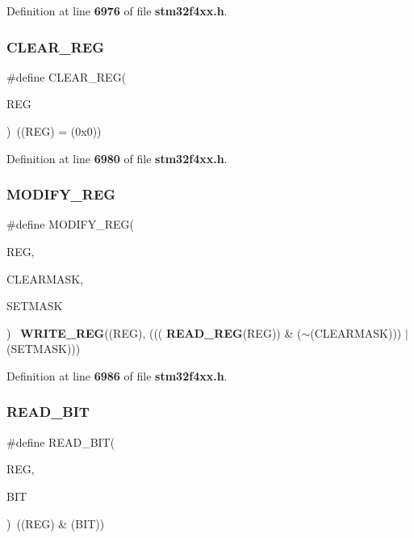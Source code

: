 Definition at line \textbf{ 6976} of file \textbf{ stm32f4xx.\+h}.

\mbox{\label{group__Exported__macro_ga1378fbdda39f40b85420df55f41460ef}} 
\subsubsection{C\+L\+E\+A\+R\+\_\+\+R\+EG}
{\footnotesize\ttfamily \#define C\+L\+E\+A\+R\+\_\+\+R\+EG(\begin{DoxyParamCaption}\item[{}]{R\+EG }\end{DoxyParamCaption})~((R\+EG) = (0x0))}



Definition at line \textbf{ 6980} of file \textbf{ stm32f4xx.\+h}.

\mbox{\label{group__Exported__macro_ga6553c99f510c3bab8cc0a91602053247}} 
\subsubsection{M\+O\+D\+I\+F\+Y\+\_\+\+R\+EG}
{\footnotesize\ttfamily \#define M\+O\+D\+I\+F\+Y\+\_\+\+R\+EG(\begin{DoxyParamCaption}\item[{}]{R\+EG,  }\item[{}]{C\+L\+E\+A\+R\+M\+A\+SK,  }\item[{}]{S\+E\+T\+M\+A\+SK }\end{DoxyParamCaption})~\textbf{ W\+R\+I\+T\+E\+\_\+\+R\+EG}((R\+EG), (((\textbf{ R\+E\+A\+D\+\_\+\+R\+EG}(R\+EG)) \& ($\sim$(C\+L\+E\+A\+R\+M\+A\+SK))) $\vert$ (S\+E\+T\+M\+A\+SK)))}



Definition at line \textbf{ 6986} of file \textbf{ stm32f4xx.\+h}.

\mbox{\label{group__Exported__macro_ga822bb1bb9710d5f2fa6396b84e583c33}} 
\subsubsection{R\+E\+A\+D\+\_\+\+B\+IT}
{\footnotesize\ttfamily \#define R\+E\+A\+D\+\_\+\+B\+IT(\begin{DoxyParamCaption}\item[{}]{R\+EG,  }\item[{}]{B\+IT }\end{DoxyParamCaption})~((R\+EG) \& (B\+IT))}



